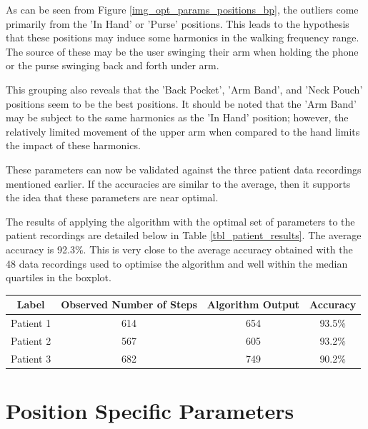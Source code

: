             As can be seen from Figure \ref{img_opt_params_positions_bp}, the outliers come primarily from the 'In Hand' or 'Purse' positions. This leads to the hypothesis that these positions may induce some harmonics in the walking frequency range. The source of these may be the user swinging their arm when holding the phone or the purse swinging back and forth under arm.

            This grouping also reveals that the 'Back Pocket', 'Arm Band', and 'Neck Pouch' positions seem to be the best positions. It should be noted that the 'Arm Band' may be subject to the same harmonics as the 'In Hand' position; however, the relatively limited movement of the upper arm when compared to the hand limits the impact of these harmonics.

            These parameters can now be validated against the three patient data recordings mentioned earlier. If the accuracies are similar to the average, then it supports the idea that these parameters are near optimal.

            The results of applying the algorithm with the optimal set of parameters to the patient recordings are detailed below in Table \ref{tbl_patient_results}. The average accuracy is 92.3\%. This is very close to the average accuracy obtained with the 48 data recordings used to optimise the algorithm and well within the median quartiles in the boxplot.

            \begin{center}
                \label{tbl_patient_results}
                \begin{tabular}{|c|c|c|c|}
                    \hline
                    Label & Observed Number of Steps & Algorithm Output & Accuracy \\
                    \hline
                    Patient 1 & 614 & 654 & 93.5\% \\ 
                    Patient 2 & 567 & 605 & 93.2\% \\
                    Patient 3 & 682 & 749 & 90.2\% \\
                    \hline
                \end{tabular}
            \end{center}

        \section{Position Specific Parameters}

